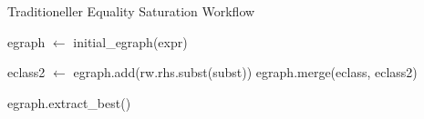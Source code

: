 \begin{algorithm}[H]
  \caption{Traditioneller Equality Saturation Workflow}\label{alg:eqsat}
  \begin{algorithmic}
    \State egraph $\gets$ initial\_egraph(expr)
    
      
          \State  eclass2 $\gets$ egraph.add(rw.rhs.subst(subst))
          \State egraph.merge(eclass, eclass2)
        \EndFor 
      \EndFor
    \EndWhile

    \State \Return egraph.extract\_best()
    \EndFunction
  \end{algorithmic}
\end{algorithm}
